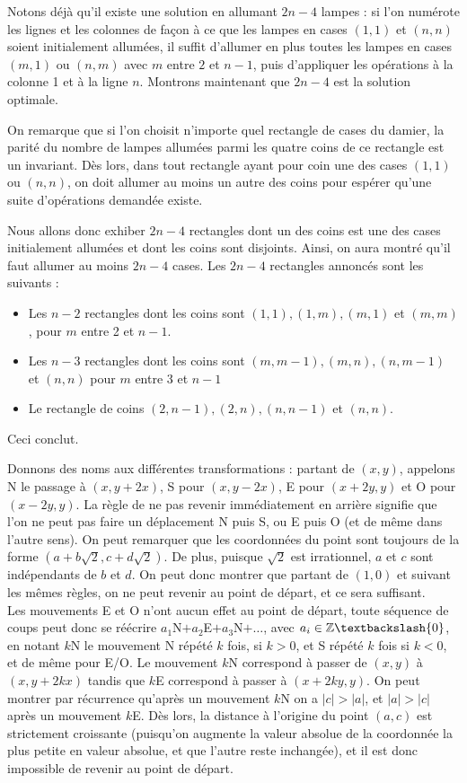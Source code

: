 \begin{sol}
Notons déjà qu'il existe une solution en allumant $2n-4$ lampes : si l'on numérote les lignes et les colonnes de façon à ce que les lampes en cases $(1,1)$ et $(n,n)$ soient initialement allumées, il suffit d'allumer en plus toutes les lampes en cases $(m,1)$ ou $(n,m)$ avec $m$ entre $2$ et $n-1$, puis d'appliquer les opérations à la colonne 1 et à la ligne $n$. Montrons maintenant que $2n-4$ est la solution optimale.\par
On remarque que si l'on choisit n'importe quel rectangle de cases du damier, la parité du nombre de lampes allumées parmi les quatre coins de ce rectangle est un invariant. Dès lors, dans tout rectangle ayant pour coin une des cases $(1,1)$ ou $(n,n)$, on doit allumer au moins un autre des coins pour espérer qu'une suite d'opérations demandée existe.\par
Nous allons donc exhiber $2n-4$ rectangles dont un des coins est une des cases initialement allumées et dont les coins sont disjoints. Ainsi, on aura montré qu'il faut allumer au moins $2n-4$ cases. Les $2n-4$ rectangles annoncés sont les suivants :
\begin{itemize}
\item Les $n-2$ rectangles dont les coins sont $(1,1), (1,m), (m,1)$ et $(m,m)$, pour $m$ entre 2 et $n-1$.
\item Les $n-3$ rectangles dont les coins sont $(m,m-1), (m,n),(n,m-1)$ et $(n,n)$ pour $m$ entre 3 et $n-1$
\item Le rectangle de coins $(2,n-1), (2,n), (n,n-1)$ et $(n,n)$.
\end{itemize}
Ceci conclut.
\end{sol}

\begin{sol}
Donnons des noms aux différentes transformations : partant de $(x,y)$, appelons N le passage à $(x,y+2x)$, S pour $(x,y-2x)$, E pour $(x+2y,y)$ et O pour $(x-2y,y)$. La règle de ne pas revenir immédiatement en arrière signifie que l'on ne peut pas faire un déplacement N puis S, ou E puis O (et de même dans l'autre sens). On peut remarquer que les coordonnées du point sont toujours de la forme $(a+b\sqrt2,c+d\sqrt2)$. De plus, puisque $\sqrt2$ est irrationnel, $a$ et $c$ sont indépendants de $b$ et $d$. On peut donc montrer que partant de $(1,0)$ et suivant les mêmes règles, on ne peut revenir au point de départ, et ce sera suffisant.\\ Les mouvements E et O n'ont aucun effet au point de départ, toute séquence de coups peut donc se réécrire $a_1$N$+a_2$E$+a_3$N$+\ldots$, avec $a_i\in\Z\textbackslash\{0\}$, en notant $k$N le mouvement N répété $k$ fois, si $k>0$, et S répété $k$ fois si $k<0$, et de même pour E/O. Le mouvement $k$N correspond à passer de $(x,y)$ à $(x,y+2kx)$ tandis que $k$E correspond à passer à $(x+2ky,y)$. On peut montrer par récurrence qu'après un mouvement $k$N on a $|c|>|a|$, et $|a|>|c|$ après un mouvement $k$E. Dès lors, la distance à l'origine du point $(a,c)$ est strictement croissante (puisqu'on augmente la valeur absolue de la coordonnée la plus petite en valeur absolue, et que l'autre reste inchangée), et il est donc impossible de revenir au point de départ.
\end{sol}

